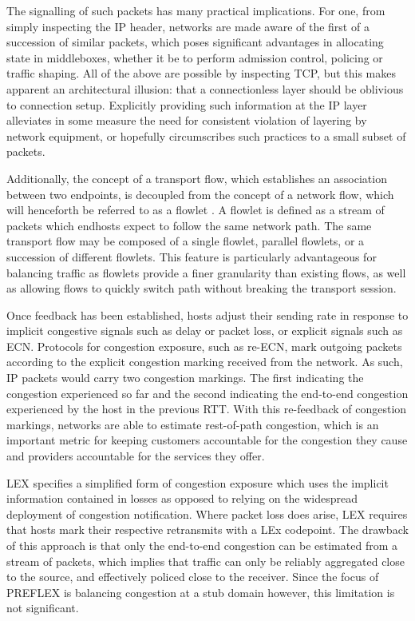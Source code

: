 The signalling of such packets has many practical implications. 
For one, from simply inspecting the \ac{IP} header, networks are made aware of the first of a succession of similar packets, which poses significant advantages in allocating state in middleboxes, whether it be to perform admission control, policing or traffic shaping. 
All of the above are possible by inspecting \ac{TCP}, but this makes apparent an architectural illusion: that a connectionless layer should be oblivious to connection setup. 
Explicitly providing such information at the \ac{IP} layer alleviates in some measure the need for consistent violation of layering by network equipment, or hopefully circumscribes such practices to a small subset of packets.

Additionally, the concept of a transport flow, which establishes an association between two endpoints, is decoupled from the concept of a network flow, which will henceforth be referred to as a flowlet \cite{Sinha:2004p124}. 
A flowlet is defined as a stream of packets which endhosts expect to follow the same network path. 
The same transport flow may be composed of a single flowlet, parallel flowlets, or a succession of different flowlets. 
This feature is particularly advantageous for balancing traffic as flowlets provide a finer granularity than existing flows, as well as allowing flows to quickly switch path without breaking the transport session.

Once feedback has been established, hosts adjust their sending rate in response to implicit congestive signals such as delay or packet loss, or explicit signals such as \ac{ECN}. Protocols for congestion exposure, such as re-\ac{ECN}, mark outgoing packets according to the explicit congestion marking received from the network. As such, \ac{IP} packets would carry two congestion markings. The first indicating the congestion experienced so far and the second indicating the end-to-end congestion experienced by the host in the previous RTT. With this re-feedback of congestion markings, networks are able to estimate rest-of-path congestion, which is an important metric for keeping customers accountable for the congestion they cause and providers accountable for the services they offer.

\ac{LEX} specifies a simplified form of congestion exposure which uses the implicit information contained in losses as opposed to relying on the widespread deployment of congestion notification. Where packet loss does arise, \ac{LEX} requires that hosts mark their respective retransmits with a \ac{LEx} codepoint. The drawback of this approach is that only the end-to-end congestion can be estimated from a stream of packets, which implies that traffic can only be reliably aggregated close to the source, and effectively policed close to the receiver. Since the focus of \ac{PREFLEX} is balancing congestion at a stub domain however, this limitation is not significant.

